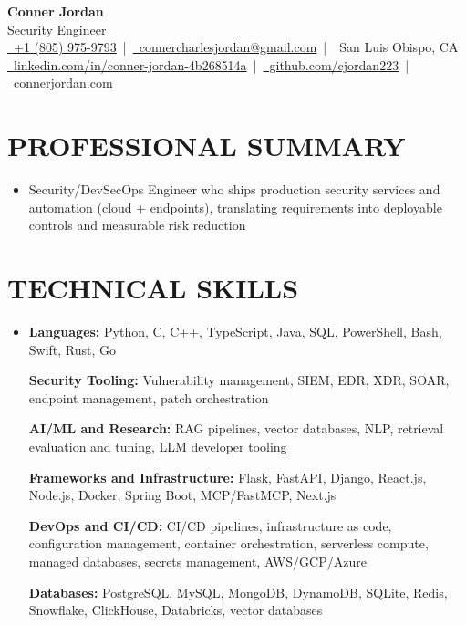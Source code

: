 \documentclass[letterpaper,10pt]{article}
\newcommand{\resumeSubHeadingListStart}{\begin{itemize}[leftmargin=0in,label={}]}
\newcommand{\resumeSubHeadingListEnd}{\end{itemize}}
\begin{document}
\begin{center}
  {\Huge \textbf{Conner Jordan}}\\[0pt]
  {\Large Security Engineer}\\[0pt]
  \href{tel:+18059759793}{\faPhone\ +1 (805) 975-9793} \,|\, 
  \href{mailto:connercharlesjordan@gmail.com}{\faEnvelope\ connercharlesjordan@gmail.com} \,|\, 
  \faMapMarker\ San Luis Obispo, CA \\[-2pt]
  \href{https://www.linkedin.com/in/conner-jordan-4b268514a/}{\faLinkedin\ linkedin.com/in/conner-jordan-4b268514a}
  \,|\, \href{https://github.com/cjordan223}{\faGithub\ github.com/cjordan223}
  \,|\, \href{https://connerjordan.com/}{\faGlobe\ connerjordan.com}
\end{center}

\vspace{4pt}

\section{PROFESSIONAL SUMMARY}
\vspace{8pt}
\resumeSubHeadingListStart
\item {\small
Security/DevSecOps Engineer who ships production security services and automation (cloud + endpoints), translating requirements into deployable controls and measurable risk reduction}
\resumeSubHeadingListEnd
\vspace{6pt}

\section{TECHNICAL SKILLS}
\vspace{6pt}
\resumeSubHeadingListStart
\item {\small
\textbf{Languages:} Python, C, C++, TypeScript, Java, SQL, PowerShell, Bash, Swift, Rust, Go

\vspace{3pt}
\textbf{Security Tooling:} Vulnerability management, SIEM, EDR, XDR, SOAR, endpoint management, patch orchestration

\vspace{3pt}
\textbf{AI/ML and Research:} RAG pipelines, vector databases, NLP, retrieval evaluation and tuning, LLM developer tooling

\vspace{3pt}
\textbf{Frameworks and Infrastructure:} Flask, FastAPI, Django, React.js, Node.js, Docker, Spring Boot, MCP/FastMCP, Next.js

\vspace{3pt}
\textbf{DevOps and CI/CD:} CI/CD pipelines, infrastructure as code, configuration management, container orchestration, serverless compute, managed databases, secrets management, AWS/GCP/Azure

\vspace{3pt}
\textbf{Databases:} PostgreSQL, MySQL, MongoDB, DynamoDB, SQLite, Redis, Snowflake, ClickHouse, Databricks, vector databases
}
\resumeSubHeadingListEnd
\vspace{6pt}
\end{document}
